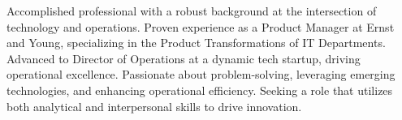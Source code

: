 

\begin{cvparagraph}

Accomplished professional with a robust background at the intersection of technology and operations. Proven experience as a Product Manager at Ernst and Young, specializing in the Product Transformations of IT Departments. Advanced to Director of Operations at a dynamic tech startup, driving operational excellence. Passionate about problem-solving, leveraging emerging technologies, and enhancing operational efficiency. Seeking a role that utilizes both analytical and interpersonal skills to drive innovation.
\end{cvparagraph}